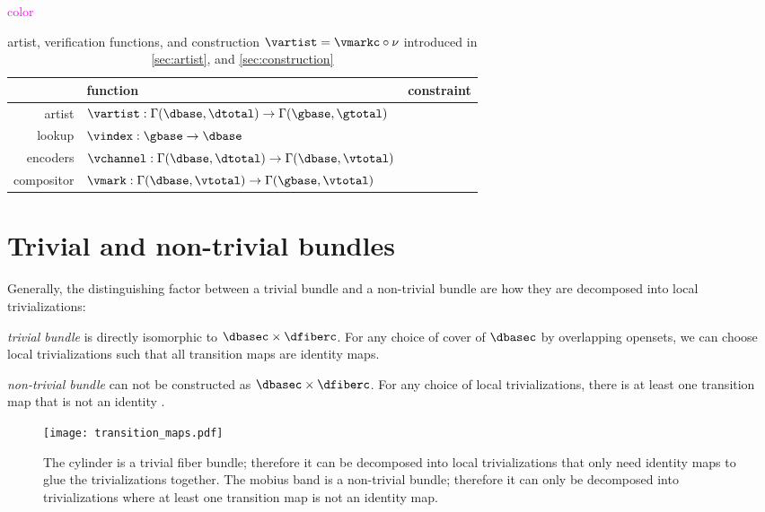 \documentclass[journal]{IEEEtran}
\newcommand{\note}[1]{\textcolor{magenta}{#1}}
\theoremstyle{definition}
\theoremstyle{remark}
\begin{document}
\note{color}
\begin{table}[H]
  \centering
  {\renewcommand{\arraystretch}{1.2}
\begin{tabular}{|r|l|l|}
  \hline
      & function & constraint \\
  \hline
  \textcolor{artist}{artist} & $\vartist: \Gamma(\dbase, \dtotal) \rightarrow \Gamma(\gbase, \gtotal)$ &  \\
  \hline
  \textcolor{functor}{lookup} & $\vindex: \gbase\rightarrow \dbase$  &  \\
  \hline
  \textcolor{artist}{encoders} & $\vchannel: \Gamma(\dbase, \dtotal) \rightarrow \Gamma(\dbase, \vtotal) $  & \\
  \hline
  \textcolor{artist}{compositor} & $\vmark: \Gamma(\dbase,\vtotal) \rightarrow \Gamma(\gbase, \vtotal)$ &  \\
  \hline
\end{tabular}
\caption{artist, verification functions, and construction $\vartist = \vmarkc \circ \nu$ introduced in \autoref{sec:artist}, and \autoref{sec:construction}}
\label{tab:appendix:summary:artist}
}
\end{table}

\section{Trivial and non-trivial bundles}
\label{sec:appendix:bundle_triviality}

Generally, the distinguishing factor between a trivial bundle and a non-trivial bundle are how they are decomposed into local trivializations:
\begin{LaTeXdescription}
  \item[\textit{trivial bundle}] is directly isomorphic to $\dbasec\times\dfiberc$. For any choice of cover of $\dbasec$ by overlapping opensets, we can choose local trivializations such that all transition maps are identity maps.
  \item[\textit{non-trivial bundle}] can not be constructed as $\dbasec\times\dfiberc$. For any choice of local trivializations, there is at least one transition map that is not an identity \cite{hatcherAlgebraicTopology2002}.
\end{LaTeXdescription}


\begin{figure}[H]
  \texttt{[image: transition\_maps.pdf]}
  \caption{The cylinder is a trivial fiber bundle; therefore it can be decomposed into local trivializations that only need identity
  maps to glue the trivializations together. The mobius band is a non-trivial bundle; therefore it can only be decomposed into trivializations where at least one transition map is not an identity map. }\label{fig:cyl_mob_bundles}
\end{figure}
\end{document}
